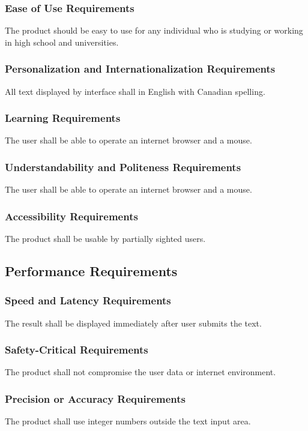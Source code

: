 \documentclass[12pt, titlepage]{article}
\begin{document}
\subsubsection*{Ease of Use Requirements}
The product should be easy to use for any individual who is studying or working in high school and universities.


\subsubsection{Personalization and Internationalization Requirements}
All text displayed by interface shall in English with Canadian spelling.


\subsubsection{Learning Requirements}
The user shall be able to operate an internet browser and a mouse.


\subsubsection{Understandability and Politeness Requirements}
The user shall be able to operate an internet browser and a mouse.


\subsubsection{Accessibility Requirements}
The product shall be usable by partially sighted users.


\subsection{Performance Requirements}
\subsubsection*{Speed and Latency Requirements}
The result shall be displayed immediately after user submits the text.


\subsubsection{Safety-Critical Requirements}
The product shall not compromise the user data or internet environment.


\subsubsection{Precision or Accuracy Requirements}
The product shall use integer numbers outside the text input area.
\end{document}
